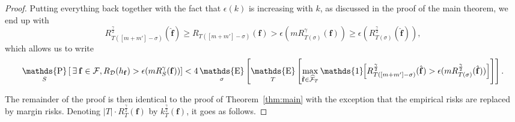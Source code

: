 \documentclass[twoside,11pt]{article}
\newcommand{\Id}[1]{\mathds{1}\hspace{-2.5pt}\left[#1\right]}
\let\oldexists=\exists
\renewcommand{\exists}{\hspace{1pt}\oldexists\hspace{1pt}}
\newcommand{\abs}[1]{\left|#1\right|}
\newcommand{\D}{\mathcal{D}}
\newcommand{\F}{\mathcal{F}}
\newcommand{\f}{\mathbf{f}}
\newcommand{\fhat}{\hat{\f}}
\newcommand{\fcover}{\widehat{\F}_T}
\DeclareMathOperator*{\Prob}{\mathds{P}}
\newcommand{\prob}[2]{\Prob_{#1}\left[#2\right]}
\DeclareMathOperator*{\Expectation}{\mathds{E}}
\newcommand{\exv}[2]{\Expectation_{#1}\left[#2\right]}
\begin{document}
\begin{proof}
Putting everything back together with the fact that $\epsilon(k)$ is increasing with $k$, as discussed in the proof of the main theorem, we end up with
\begin{equation*}
    R^{\frac{\gamma}{2}}_{T([m+m']-\sigma)}(\fhat) \ge R_{T([m+m']-\sigma)}(\f) > \epsilon(m R^\gamma_{T(\sigma)}(\f)) \ge \epsilon(R^\frac{\gamma}{2}_{T(\sigma)}(\fhat)),
\end{equation*}
which allows us to write
\begin{align*}
\prob{S}{ \exists \f \in \F, R_\D(h_\f) > \epsilon(m R^\gamma_S(\f)) }< 4 \exv{\sigma}{\exv{T}{ \max_{\fhat \in \fcover} \Id{R^{\frac{\gamma}{2}}_{T([m+m']-\sigma)}(\fhat) > \epsilon(m R^\frac{\gamma}{2}_{T(\sigma)}(\fhat)) } }}.
\end{align*}

The remainder of the proof is then identical to the proof of Theorem~\ref{thm:main} with the exception that the empirical risks are replaced by margin risks.
Denoting $\abs{T} \cdot R^{\frac{\gamma}{2}}_T(\f)$ by $k^{\frac{\gamma}{2}}_T(\f)$, it goes as follows.


\end{proof}
\end{document}
